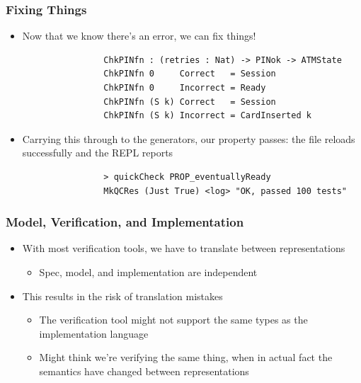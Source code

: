 \documentclass[compress]{beamer}
\begin{document}
\begin{frame}[fragile]
  \frametitle{Fixing Things}

  \large

  \begin{itemize}
    \item<1-> Now that we know there's an error, we can fix things!\pause
              \begin{verbatim}
                ChkPINfn : (retries : Nat) -> PINok -> ATMState
                ChkPINfn 0     Correct   = Session
                ChkPINfn 0     Incorrect = Ready
                ChkPINfn (S k) Correct   = Session
                ChkPINfn (S k) Incorrect = CardInserted k
              \end{verbatim}

    \item<3-> Carrying this through to the generators, our property passes: the
              file reloads successfully and the REPL reports
              \begin{verbatim}
                > quickCheck PROP_eventuallyReady
                MkQCRes (Just True) <log> "OK, passed 100 tests"
              \end{verbatim}
  \end{itemize}

  \vspace*{-5mm}

\end{frame}


\begin{frame}

  \large

  \frametitle{Model, Verification, and Implementation}
  \begin{itemize}
    \item<1-> With most verification tools, we have to translate between
              representations
    \begin{itemize}
      \item<1-> {\normalsize Spec, model, and implementation are independent}
    \end{itemize}
    \item<2-> This results in the risk of translation mistakes
    \begin{itemize}
      \item<3-> {\normalsize The verification tool might not support the same
                types as the implementation language}
      \item<4-> {\normalsize Might think we're verifying the same thing, when in
                actual fact the semantics have changed between representations}
    \end{itemize}
  \end{itemize}

\end{frame}
\end{document}
